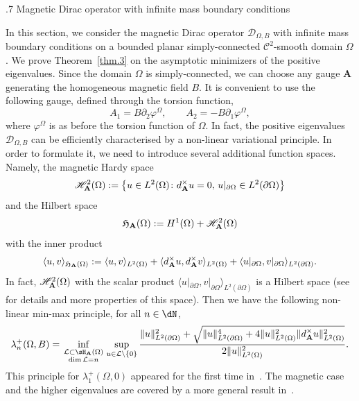 \documentclass[11pt,a4paper]{amsart}
\makeatletter
\newcommand\Omg{\Omega}
\def\section{\@startsection{section}{1}\z@{.9\linespacing\@plus\linespacing}%
	{.7\linespacing} {\fontsize{13}{14}\selectfont\bfseries\centering}}
\newcommand\sm{\setminus}
\def\p{\partial}
\def\lm{\lambda}
\def\p{\partial}
\numberwithin{figure}{section}
\numberwithin{equation}{section}
\theoremstyle{plain}%
\theoremstyle{remark}
\theoremstyle{plain}
\newcommand\cL{\mathcal L}
\makeatother
\begin{document}
\section{Magnetic Dirac operator with infinite mass boundary conditions}\label{sec.dirac}

In this section, we consider the magnetic Dirac operator $\mathscr{D}_{\Omega,B}$ with infinite mass boundary
conditions on a bounded planar simply-connected $\mathscr{C}^2$-smooth domain $\Omega$. We prove Theorem~\ref{thm.3} on the asymptotic minimizers of the positive eigenvalues. Since the domain $\Omega$ is simply-connected, we can choose any gauge $\mathbf A$ generating the homogeneous magnetic field $B$. It is convenient to use the following gauge, defined through the torsion function,
\[ A_1 =  B \partial_2 \varphi^\Omega, \qquad A_2 = - B \partial_1 \varphi^\Omega,\]
where $\varphi^\Omg$ is as before the torsion function of $\Omg$.
 In fact, the positive eigenvalues $\mathscr{D}_{\Omg,B}$ can be efficiently characterised by a non-linear variational principle.
In order to formulate it, we need to introduce several additional function spaces. Namely, the magnetic Hardy space
\[
\mathscr{H}_{\bf A}^2(\Omg) := \big\{u\in L^2(\Omg)\colon d^\times_{\bf A} u = 0, \, u|_{\p\Omg}\in L^2(\p\Omg)\big\}
\]
and the Hilbert space
\[
	\mathfrak{H}_{\bf A}(\Omg) := H^1(\Omg) + \mathscr{H}_{\bf A}^2(\Omg)
\]
with the inner product
\[
	\langle u,v\rangle_{\mathfrak{H}_{\bf A}(\Omg)} := 
	\langle u,v\rangle_{L^2(\Omg)}+ 	\langle d_{\bf A}^\times u,d^\times_{\bf A}v\rangle_{L^2(\Omg)}+  \langle u|_{\p\Omg},v|_{\p\Omg}\rangle_{L^2(\p\Omg)}.
\]
In fact, $\mathscr{H}_{\bf A}^2(\Omg)$ with the scalar product $\langle u|_{\p\Omg},v|_{\p\Omg}\rangle_{L^2(\p\Omg)}$ is a Hilbert space (see \cite[Section 2.1]{BLRS23} for details and more properties of this space). Then we have the following non-linear min-max principle, for all $n\in\dN$,
\begin{equation}\label{eq:minmaxDirac}
	\lm_n^+(\Omg,B) = \inf_{\begin{smallmatrix} \cL\subset\sH_{{\bf A}}(\Omg)\\ \dim \cL = n\end{smallmatrix}}\sup_{u\in\cL\sm\{0\}} \frac{\|u\|^2_{L^2(\p\Omg)} + \sqrt{\|u\|^4_{L^2(\p\Omg)}+ 4\|u\|^2_{L^2(\Omg)} \|d_{\bf A}^\times u\|^2_{L^2(\Omg)}}}{2\|u\|^2_{L^2(\Omg)}}.
\end{equation}
This principle for $\lm_1^+(\Omg,0)$ appeared for the first time in~\cite[Theorem 4]{ABLO21}. The magnetic case and the higher eigenvalues are covered by a more general result in~\cite[Theorem 1.9]{BLRS23}.
\medskip
\end{document}
